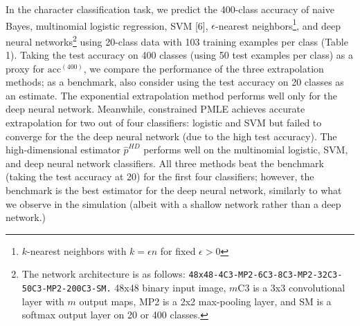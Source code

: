 \documentclass[12pt]{article}
\begin{document}
In the character classification task, we predict the 400-class accuracy of naive Bayes, multinomial
logistic regression, SVM [6], $\epsilon$-nearest neighbors\footnote{$k$-nearest neighbors with $k = \epsilon n$ for fixed $\epsilon > 0$}, and deep neural networks\footnote{The network architecture is as follows: 
{\tt 48x48-4C3-MP2-6C3-8C3-MP2-32C3-50C3-MP2-200C3-SM.}
48x48 binary input image, $m$C3 is a 3x3 convolutional layer with $m$ output maps, MP2 is a 2x2 max-pooling layer, and SM is a softmax output layer on 20 or 400 classes.} using 20-class data with 103 training examples per class (Table 1).
Taking the test accuracy on 400 classes (using 50 test examples per class) as a proxy for $\text{acc}^{(400)}$,
we compare the performance of the three extrapolation methods; as a benchmark,
also consider using the test accuracy on 20 classes as an estimate.
The exponential extrapolation method performs well only for the deep neural network.  Meanwhile, constrained PMLE achieves accurate extrapolation for two out of four classifiers: logistic and SVM
but failed to converge for the the deep neural network (due to the high test accuracy).
The high-dimensional estimator $\hat{p}^{HD}$  performs well on the multinomial logistic, SVM, and deep neural network classifiers.  All three methods beat the benchmark (taking the test accuracy at 20) for the first four classifiers;
however, the benchmark is the best estimator for the deep neural network,
similarly to what we observe in the simulation (albeit with a shallow network rather than a deep network.)
\end{document}
